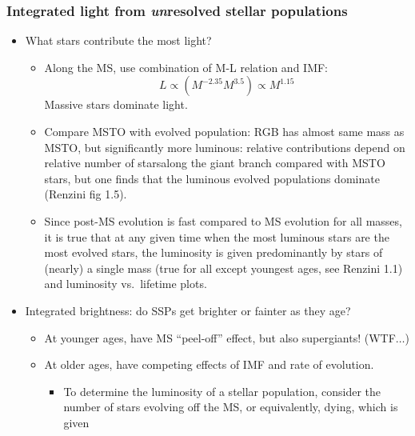 \documentclass{article}
\begin{document}
\subsubsection{Integrated light from \emph{un}resolved stellar populations}
      \begin{itemize}
        \item What stars contribute the most light?
            \begin{itemize}
                \item Along the MS, use combination of M-L relation and IMF:
                    $$ L \propto (M^{-2.35}M^{3.5}) \propto M^{1.15} $$
                    Massive stars dominate light.
                \item Compare MSTO with evolved population: RGB has almost
                    same mass as MSTO, but significantly more luminous: relative
                    contributions depend on relative number of starsalong the
                    giant branch compared with MSTO stars, but one finds that
                    the luminous evolved populations dominate (Renzini fig 1.5).
                \item Since post-MS evolution is fast compared to MS evolution
                    for all masses, it is true that at any given time when the
                    most luminous stars are the most evolved stars, the luminosity
                    is given predominantly by stars of (nearly) a single mass
                    (true for all except youngest ages, see Renzini 1.1) and
                    luminosity vs.\ lifetime plots.
            \end{itemize}
        \item Integrated brightness: do SSPs get brighter or fainter as they age?
            \begin{itemize}
                \item At younger ages, have MS ``peel-off'' effect, but also
                    supergiants! (WTF$\ldots$)
                \item At older ages, have competing effects of IMF and rate of
                    evolution.
                    \begin{itemize}
                        \item To determine the luminosity of a stellar
                            population, consider the number of stars evolving
                            off the MS, or equivalently, dying, which is given

\end{itemize}
\end{itemize}
\end{itemize}
\end{document}
